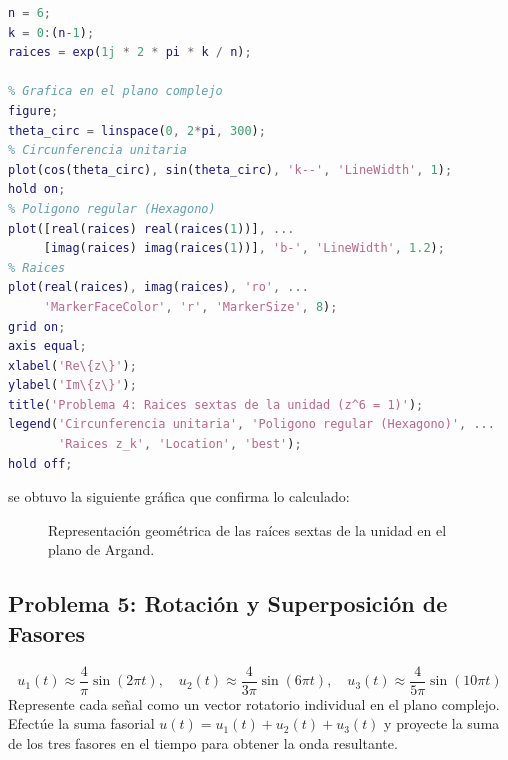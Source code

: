 \documentclass[11pt,a4paper]{article}
\begin{document}
\begin{lstlisting}[language=Matlab, frame=single, basicstyle=\small\ttfamily, breaklines=true, keywordstyle=\color{blue}, commentstyle=\color{green!50!black}]
% Calculo de las raices sextas de la unidad: z^6 = 1
n = 6;
k = 0:(n-1);
raices = exp(1j * 2 * pi * k / n);

% Grafica en el plano complejo
figure;
theta_circ = linspace(0, 2*pi, 300);
% Circunferencia unitaria
plot(cos(theta_circ), sin(theta_circ), 'k--', 'LineWidth', 1);
hold on;
% Poligono regular (Hexagono)
plot([real(raices) real(raices(1))], ...
     [imag(raices) imag(raices(1))], 'b-', 'LineWidth', 1.2);
% Raices
plot(real(raices), imag(raices), 'ro', ...
     'MarkerFaceColor', 'r', 'MarkerSize', 8);
grid on;
axis equal;
xlabel('Re\{z\}');
ylabel('Im\{z\}');
title('Problema 4: Raices sextas de la unidad (z^6 = 1)');
legend('Circunferencia unitaria', 'Poligono regular (Hexagono)', ...
       'Raices z_k', 'Location', 'best');
hold off;
\end{lstlisting}

\noindent se obtuvo la siguiente gráfica que confirma lo calculado:

\begin{figure}[htbp]
    \centering
    \caption{Representación geométrica de las raíces sextas de la unidad en el plano de Argand.}
    \label{fig:problema4_raices}
\end{figure}

\subsection{Problema 5: Rotación y Superposición de Fasores}

\[
u_1(t) \approx \frac{4}{\pi}\sin(2\pi t), \quad u_2(t) \approx \frac{4}{3\pi}\sin(6\pi t), \quad u_3(t) \approx \frac{4}{5\pi}\sin(10\pi t)
\]
Represente cada señal como un vector rotatorio individual en el plano complejo. Efectúe la suma fasorial $u(t) = u_1(t) + u_2(t) + u_3(t)$ y proyecte la suma de los tres fasores en el tiempo para obtener la onda resultante.
\end{document}
